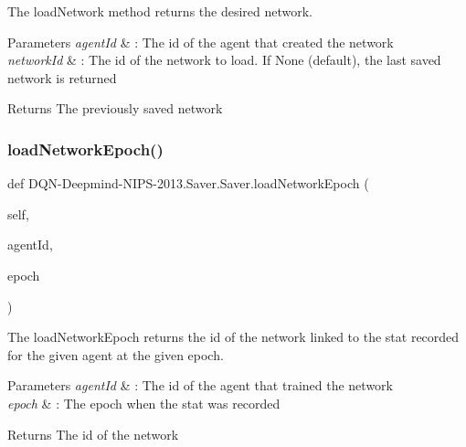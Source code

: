 The load\+Network method returns the desired network. 


\begin{DoxyParams}{Parameters}
{\em agent\+Id} & \+: The id of the agent that created the network \\
\hline
{\em network\+Id} & \+: The id of the network to load. If None (default), the last saved network is returned\\
\hline
\end{DoxyParams}
\begin{DoxyReturn}{Returns}
The previously saved network 
\end{DoxyReturn}
\hypertarget{classDQN-Deepmind-NIPS-2013_1_1Saver_1_1Saver_aad377d9e28499a19a591d080e6a0df63}{}\label{classDQN-Deepmind-NIPS-2013_1_1Saver_1_1Saver_aad377d9e28499a19a591d080e6a0df63} 
\subsubsection{\texorpdfstring{load\+Network\+Epoch()}{loadNetworkEpoch()}}
{\footnotesize\ttfamily def D\+QN-\/Deepmind-\/N\+I\+PS-\/2013.Saver.\+Saver.\+load\+Network\+Epoch (\begin{DoxyParamCaption}\item[{}]{self,  }\item[{}]{agent\+Id,  }\item[{}]{epoch }\end{DoxyParamCaption})}



The load\+Network\+Epoch returns the id of the network linked to the stat recorded for the given agent at the given epoch. 


\begin{DoxyParams}{Parameters}
{\em agent\+Id} & \+: The id of the agent that trained the network \\
\hline
{\em epoch} & \+: The epoch when the stat was recorded\\
\hline
\end{DoxyParams}
\begin{DoxyReturn}{Returns}
The id of the network 
\end{DoxyReturn}
\hypertarget{classDQN-Deepmind-NIPS-2013_1_1Saver_1_1Saver_a21a3603e2a8e8d12d60a2640b224b952}{}\label{classDQN-Deepmind-NIPS-2013_1_1Saver_1_1Saver_a21a3603e2a8e8d12d60a2640b224b952} 
